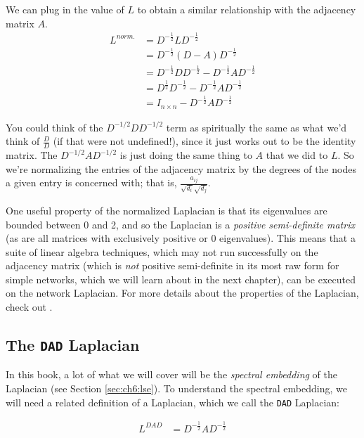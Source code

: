 We can plug in the value of $L$ to obtain a similar relationship with the adjacency matrix $A$.
\begin{align*}
    L^{norm.} &=  D^{-\frac{1}{2}}L D^{-\frac{1}{2}} \\
    &=  D^{-\frac{1}{2}}(D - A) D^{-\frac{1}{2}} \\
    &= D^{-\frac{1}{2}}DD^{-\frac{1}{2}} - D^{-\frac{1}{2}}A D^{-\frac{1}{2}} \\
    &= D^{\frac{1}{2}}D^{-\frac{1}{2}} - D^{-\frac{1}{2}}A D^{-\frac{1}{2}} \\
    &= I_{n \times n} - D^{-\frac{1}{2}}A D^{-\frac{1}{2}}
\end{align*}

You could think of the $D^{-1/2} D D^{-1/2}$ term as spiritually the same as what we'd think of $\frac{D}{D}$ (if that were not undefined!), since it just works out to be the identity matrix. The $D^{-1/2} A D^{-1/2}$ is just doing the same thing to $A$ that we did to $L$. So we're normalizing the entries of the adjacency matrix by the degrees of the nodes a given entry is concerned with; that is, $\frac{a_{ij}}{\sqrt{d_i}\sqrt{d_j}}$.

One useful property of the normalized Laplacian is that its eigenvalues are bounded between 0 and 2, and so the Laplacian is a \emph{positive semi-definite matrix} (as are all matrices with exclusively positive or 0 eigenvalues). This means that a suite of linear algebra techniques, which may not run successfully on the adjacency matrix (which is \emph{not} positive semi-definite in its most raw form for simple networks, which we will learn about in the next chapter), can be executed on the network Laplacian. For more details about the properties of the Laplacian, check out \cite{Li2014Dec}.

\subsection{The \texttt{DAD} Laplacian}
\label{sec:ch4:mtx-rep:dad_laplacian}

In this book, a lot of what we will cover will be the \emph{spectral embedding} of the Laplacian (see Section \ref{sec:ch6:lse}). To understand the spectral embedding, we will need a related definition of a Laplacian, which we call the \texttt{DAD} Laplacian:

\begin{align*}
    L^{DAD} &= D^{-\frac{1}{2}}A D^{-\frac{1}{2}}
\end{align*}

